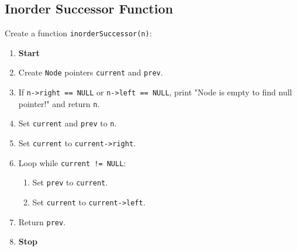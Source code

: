 {  \subsection{Inorder Successor Function}
  Create a function \texttt{inorderSuccessor(n)}:
  \begin{enumerate}[label=\arabic*:,left=0pt]
    \item \textbf{Start}
    \item Create \texttt{Node} pointers \texttt{current} and \texttt{prev}.
    \item If \texttt{n->right == NULL} or \texttt{n->left == NULL}, print "Node is empty to find null pointer!" and \newline return \texttt{n}.
    \item Set \texttt{current} and \texttt{prev} to \texttt{n}.
    \item Set \texttt{current} to \texttt{current->right}.
    \item Loop while \texttt{current != NULL}:
          \begin{enumerate}[label=6.\arabic*:, start=1]
            \item Set \texttt{prev} to \texttt{current}.
            \item Set \texttt{current} to \texttt{current->left}.
          \end{enumerate}
    \item Return \texttt{prev}.
    \item \textbf{Stop}
  \end{enumerate}

}
